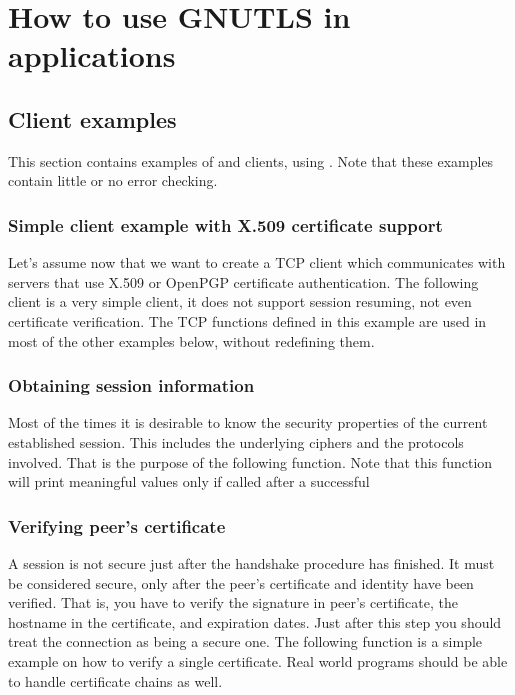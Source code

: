 \chapter{How to use GNUTLS in applications}



\label{examples}
\section{Client examples}
This section contains examples of \tls{} and \ssl{} clients, using \gnutls{}. 
Note that these examples contain little or no error checking.

\subsection{Simple client example with X.509 certificate support}
Let's assume now that we want to create a TCP client which communicates
with servers that use X.509 or OpenPGP certificate authentication. The following client
is a very simple \tls{} client, it does not support session resuming, not
even certificate verification. The TCP functions defined in this example
are used in most of the other examples below, without redefining them.


\subsection{Obtaining session information}
Most of the times it is desirable to know the security properties of
the current established session. This includes the underlying ciphers and
the protocols involved. That is the purpose of the following function.
Note that this function will print meaningful values only if
called after a successful 



\subsection{Verifying peer's certificate}
A \tls{} session is not secure just after the handshake procedure has finished.
It must be considered secure, only after the peer's certificate and identity have been
verified. That is, you have to verify the signature in peer's 
certificate, the hostname in the certificate, and expiration dates.
Just after this step you should treat the connection as being a secure one.
The following function is a simple example on how to verify a single certificate.
Real world programs should be able to handle certificate chains as well.

